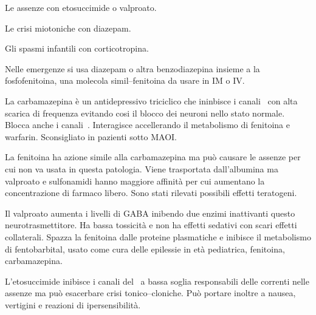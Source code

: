 Le assenze con etosuccimide o valproato.

Le crisi miotoniche con diazepam.

Gli spasmi infantili con corticotropina.

Nelle emergenze si usa diazepam o altra benzodiazepina insieme a la fosfofenitoina, una molecola simil--fenitoina da usare in IM o IV.

La carbamazepina è un antidepressivo triciclico che ininbisce i canali~ con alta scarica di frequenza evitando cosi il blocco dei neuroni nello stato normale. Blocca anche i canali~. Interagisce accellerando il metabolismo di fenitoina e warfarin. Sconsigliato in pazienti sotto MAOI. 

La fenitoina ha azione simile alla carbamazepina ma può causare le assenze per cui non va usata in questa patologia. Viene trasportata dall'albumina ma valproato e sulfonamidi hanno maggiore affinità per cui aumentano la concentrazione di farmaco libero. Sono stati rilevati possibili effetti teratogeni.

Il valproato aumenta i livelli di GABA inibendo due enzimi inattivanti questo neurotrasmettitore. Ha bassa tossicità e non ha effetti sedativi con scari effetti collaterali. Spazza la fenitoina dalle proteine plasmatiche e inibisce il metabolismo di fentobarbital, usato come cura delle epilessie in età pediatrica, fenitoina, carbamazepina.

L'etosuccimide inibisce i canali del~ a bassa soglia responsabili delle correnti nelle assenze ma può esacerbare crisi tonico--cloniche. Può portare inoltre a nausea, vertigini e reazioni di ipersensibilità.

\newpage